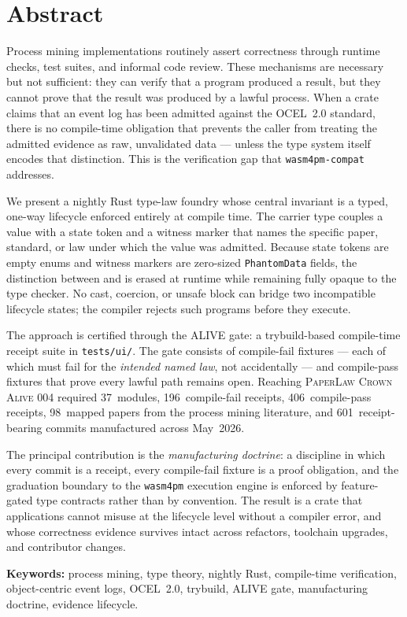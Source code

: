 \chapter*{Abstract}

Process mining implementations routinely assert correctness through runtime
checks, test suites, and informal code review. These mechanisms are necessary
but not sufficient: they can verify that a program produced a result, but they
cannot prove that the result was produced by a lawful process. When a crate
claims that an event log has been admitted against the OCEL~2.0 standard, there
is no compile-time obligation that prevents the caller from treating the
admitted evidence as raw, unvalidated data --- unless the type system itself
encodes that distinction. This is the verification gap that
\texttt{wasm4pm-compat} addresses.

We present a nightly Rust type-law foundry whose central invariant is a
typed, one-way lifecycle enforced entirely at compile time. The carrier type
 couples a value with a state token and a witness marker
that names the specific paper, standard, or law under which the value was
admitted. Because state tokens are empty enums and witness markers are
zero-sized \texttt{PhantomData} fields, the distinction between
 and  is
erased at runtime while remaining fully opaque to the type checker. No cast,
coercion, or unsafe block can bridge two incompatible lifecycle states; the
compiler rejects such programs before they execute.

The approach is certified through the ALIVE gate: a trybuild-based
compile-time receipt suite in \texttt{tests/ui/}. The gate consists of
compile-fail fixtures --- each of which must fail for the \emph{intended named
law}, not accidentally --- and compile-pass fixtures that prove every lawful path
remains open. Reaching \textsc{PaperLaw Crown Alive 004} required
37~modules, 196~compile-fail receipts, 406~compile-pass receipts, 98~mapped
papers from the process mining literature, and 601~receipt-bearing commits
manufactured across May~2026.

The principal contribution is the \emph{manufacturing doctrine}: a discipline
in which every commit is a receipt, every compile-fail fixture is a proof
obligation, and the graduation boundary to the \texttt{wasm4pm} execution
engine is enforced by feature-gated type contracts rather than by convention.
The result is a crate that applications cannot misuse at the lifecycle level
without a compiler error, and whose correctness evidence survives intact
across refactors, toolchain upgrades, and contributor changes.

\bigskip
\noindent\textbf{Keywords:} process mining, type theory, nightly Rust,
compile-time verification, object-centric event logs, OCEL~2.0, trybuild,
ALIVE gate, manufacturing doctrine, evidence lifecycle.
